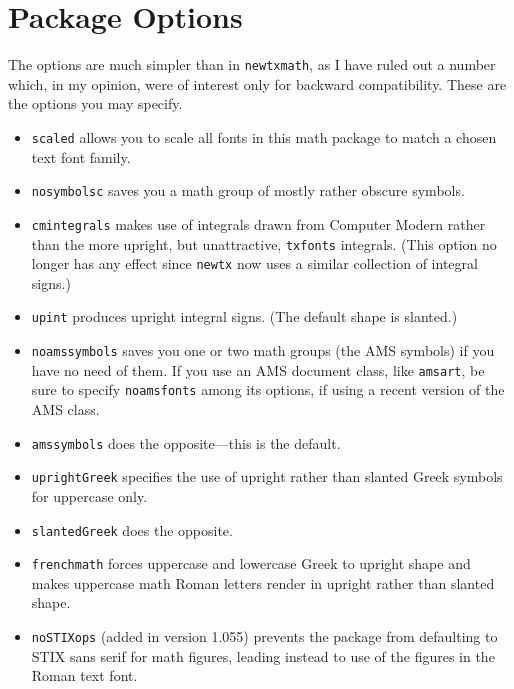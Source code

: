 \documentclass[11pt]{article}
\begin{document}
\section{Package Options}
The options are much simpler than in {\tt newtxmath}, as I have ruled out a number which, in my opinion, were of interest only for backward compatibility. These are the options you may specify.
\begin{itemize}
\item
{\tt scaled} allows you to scale all fonts in this math package to match a chosen text font family.
\item {\tt nosymbolsc} saves you a math group of mostly rather obscure symbols.
\item {\tt cmintegrals} makes use of integrals drawn from Computer Modern rather than the more upright, but unattractive, {\tt txfonts} integrals. (This option no longer has any effect since {\tt newtx} now uses a similar collection of integral signs.)
\item {\tt upint} produces upright integral signs. (The default shape is slanted.)
\item {\tt noamssymbols} saves you one or two math groups (the AMS symbols) if you have no need of them. If you use an AMS document class, like {\tt amsart}, be sure to specify {\tt noamsfonts} among its options, if using a recent version of the AMS class. 
\item {\tt amssymbols} does the opposite---this is the default.
\item {\tt uprightGreek} specifies the use of upright rather than slanted Greek symbols for uppercase only.
\item {\tt slantedGreek} does the opposite.
\item {\tt frenchmath} forces uppercase and lowercase Greek to upright shape and makes uppercase math Roman letters render in upright rather than slanted shape.
\item {\tt noSTIXops} (added in version 1.055) prevents the package from defaulting to STIX sans serif for math figures, leading instead to use of the figures in the Roman text font.

\end{itemize}
\end{document}
